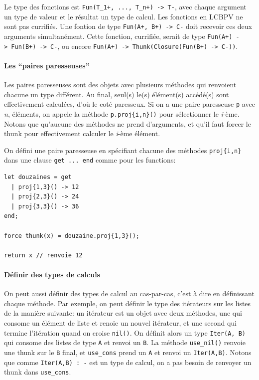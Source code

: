 \documentclass[12pt]{article}
\begin{document}
Le type des fonctions est
\texttt{Fun(T\_1+,\ ...,\ T\_n+)\ -\textgreater{}\ T-}, avec chaque
argument un type de valeur et le résultat un type de calcul. Les
fonctions en LCBPV ne sont pas currifiés. Une fontion de type
\texttt{Fun(A+,\ B+)\ -\textgreater{}\ C-} doit recevoir ces deux
arguments simultanément. Cette fonction, currifiée, serait de type
\texttt{Fun(A+)\ -\textgreater{}\ Fun(B+)\ -\textgreater{}\ C-}, ou
encore
\texttt{Fun(A+)\ -\textgreater{}\ Thunk(Closure(Fun(B+)\ -\textgreater{}\ C-))}.

\hypertarget{les-paires-paresseuses}{%
      \paragraph*{Les ``paires
            paresseuses''}\label{les-paires-paresseuses}}

Les paires paresseuses sont des objets avec plusieurs méthodes qui
renvoient chacune un type différent. Au final, seul(s) le(s) élément(s)
accédé(s) sont effectivement calculées, d'où le coté paresseux. Si on a
une paire paresseuse \texttt{p} avec \emph{n}, éléments, on appele la
méthode \texttt{p.proj\{i,n\}()} pour sélectionner le \emph{i}-ème.
Notons que qu'aucune des méthodes ne prend d'arguments, et qu'il faut
forcer le thunk pour effectivement calculer le \emph{i}-ème élément.

On défini une paire paresseuse en spécifiant chacune des méthodes
\texttt{proj\{i,n\}} dans une clause \texttt{get\ ...\ end} comme pour
les functions:

\begin{verbatim}
let douzaines = get
  | proj{1,3}() -> 12
  | proj{2,3}() -> 24
  | proj{3,3}() -> 36
end;

force thunk(x) = douzaine.proj{1,3}();

return x // renvoie 12
\end{verbatim}

\hypertarget{duxe9finir-des-types-de-calculs}{%
      \paragraph*{Définir des types de
            calculs}\label{duxe9finir-des-types-de-calculs}}

On peut aussi définir des types de calcul au cas-par-cas, c'est à dire
en définissant chaque méthode. Par exemple, on peut définir le type des
itérateurs sur les listes de la manière suivante: un itérateur est un
objet avec deux méthodes, une qui consome un élément de liste et renoie
un nouvel itérateur, et une second qui termine l'itération quand on
croise \texttt{nil()}. On définit alors un type \texttt{Iter(A,\ B)} qui
consome des listes de type \texttt{A} et renvoi un \texttt{B}. La
méthode \texttt{use\_nil()} renvoie une thunk sur le \texttt{B} final,
et \texttt{use\_cons} prend un \texttt{A} et renvoi un
\texttt{Iter(A,B)}. Notons que comme \texttt{Iter(A,B)\ :\ -} est un
type de calcul, on a pas besoin de renvoyer un thunk dans
\texttt{use\_cons}.
\end{document}
